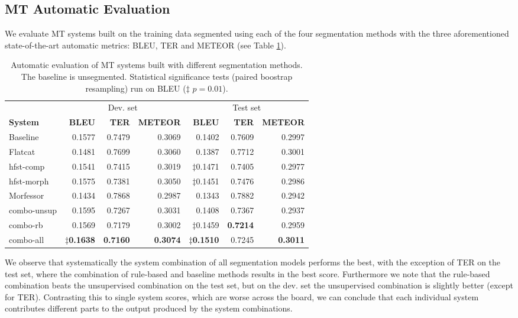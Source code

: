 \documentclass[free]{flammie}
\begin{document}
\subsection{MT Automatic Evaluation}\label{subsec:automt-eval}

We evaluate MT systems built on the training data segmented using each of the four segmentation methods with the three aforementioned state-of-the-art automatic metrics: BLEU, TER and METEOR (see Table \ref{table:automatic-evaluation}).

\begin{table}
\scriptsize{
    \centering
\begin{tabular}{lrrrrrr}
\hline
&\multicolumn{3}{c}{Dev. set} & \multicolumn{3}{c}{Test set}\\

\bf System & \bf BLEU & \bf TER & \bf METEOR & \bf BLEU & \bf TER & \bf METEOR \\
\hline
Baseline    & 0.1577 & 0.7479 & 0.3069 & 0.1402 & 0.7609 & 0.2997 \\
Flatcat     & 0.1481 & 0.7699 & 0.3060 & 0.1387 & 0.7712 & 0.3001 \\
hfst-comp   & 0.1541 & 0.7415 & 0.3019 & $\ddagger$0.1471 & 0.7405 & 0.2977 \\
hfst-morph  & 0.1575 & 0.7381 & 0.3050 & $\ddagger$0.1451 & 0.7476 & 0.2986 \\
Morfessor   & 0.1434 & 0.7868 & 0.2987 & 0.1343 & 0.7882 & 0.2942 \\
\hline
combo-unsup & 0.1595 & 0.7267 & 0.3031 & 0.1408 & 0.7367 & 0.2937 \\
combo-rb    & 0.1569 & 0.7179 & 0.3002 & $\ddagger$0.1459 & \bf 0.7214 & 0.2959 \\
combo-all   & \bf $\ddagger$0.1638 & \bf 0.7160 & \bf 0.3074 & \bf $\ddagger$0.1510 & 0.7245 & \bf 0.3011 \\
\hline
\end{tabular}
\caption{Automatic evaluation of MT systems built with different segmentation methods. The baseline is unsegmented. 
Statistical significance tests (paired boostrap resampling) run on BLEU ($\ddagger$ $p=0.01$).\label{table:automatic-evaluation}}
}
\end{table}


We observe that systematically the system combination of all segmentation models performs the best, with the exception of TER on the test set, where the combination of rule-based and baseline methods results in the best score.
Furthermore we note that the rule-based combination beats the unsupervised combination on the test set, but on the dev. set the unsupervised combination is slightly better (except for TER).
Contrasting this to single system scores, which are worse across the board, we can conclude that each individual system contributes different parts to the output produced by the system combinations.
\end{document}
